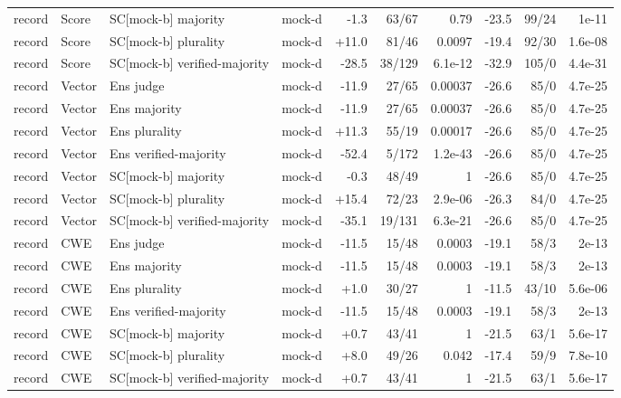 \begin{tabular}{lllrrrrrrr}
record & Score & SC[mock-b] majority & mock-d & -1.3 & 63/67 & 0.79 & -23.5 & 99/24 & 1e-11 \\
record & Score & SC[mock-b] plurality & mock-d & +11.0 & 81/46 & 0.0097 & -19.4 & 92/30 & 1.6e-08 \\
record & Score & SC[mock-b] verified-majority & mock-d & -28.5 & 38/129 & 6.1e-12 & -32.9 & 105/0 & 4.4e-31 \\
record & Vector & Ens judge & mock-d & -11.9 & 27/65 & 0.00037 & -26.6 & 85/0 & 4.7e-25 \\
record & Vector & Ens majority & mock-d & -11.9 & 27/65 & 0.00037 & -26.6 & 85/0 & 4.7e-25 \\
record & Vector & Ens plurality & mock-d & +11.3 & 55/19 & 0.00017 & -26.6 & 85/0 & 4.7e-25 \\
record & Vector & Ens verified-majority & mock-d & -52.4 & 5/172 & 1.2e-43 & -26.6 & 85/0 & 4.7e-25 \\
record & Vector & SC[mock-b] majority & mock-d & -0.3 & 48/49 & 1 & -26.6 & 85/0 & 4.7e-25 \\
record & Vector & SC[mock-b] plurality & mock-d & +15.4 & 72/23 & 2.9e-06 & -26.3 & 84/0 & 4.7e-25 \\
record & Vector & SC[mock-b] verified-majority & mock-d & -35.1 & 19/131 & 6.3e-21 & -26.6 & 85/0 & 4.7e-25 \\
record & CWE & Ens judge & mock-d & -11.5 & 15/48 & 0.0003 & -19.1 & 58/3 & 2e-13 \\
record & CWE & Ens majority & mock-d & -11.5 & 15/48 & 0.0003 & -19.1 & 58/3 & 2e-13 \\
record & CWE & Ens plurality & mock-d & +1.0 & 30/27 & 1 & -11.5 & 43/10 & 5.6e-06 \\
record & CWE & Ens verified-majority & mock-d & -11.5 & 15/48 & 0.0003 & -19.1 & 58/3 & 2e-13 \\
record & CWE & SC[mock-b] majority & mock-d & +0.7 & 43/41 & 1 & -21.5 & 63/1 & 5.6e-17 \\
record & CWE & SC[mock-b] plurality & mock-d & +8.0 & 49/26 & 0.042 & -17.4 & 59/9 & 7.8e-10 \\
record & CWE & SC[mock-b] verified-majority & mock-d & +0.7 & 43/41 & 1 & -21.5 & 63/1 & 5.6e-17 \\
\bottomrule
\end{tabular}
